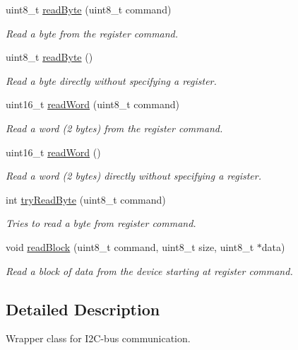 \begin{DoxyCompactItemize}
uint8\-\_\-t \hyperlink{class_i2_c_bus_a3b7cd32f752e2a5eeb6a5bdaf9267282}{read\-Byte} (uint8\-\_\-t command)
\begin{DoxyCompactList}\small\item\em \-Read a byte from the register command. \end{DoxyCompactList}\item 
uint8\-\_\-t \hyperlink{class_i2_c_bus_a1f9b4e6e0771e3de031aab0f8c5bc691}{read\-Byte} ()
\begin{DoxyCompactList}\small\item\em \-Read a byte directly without specifying a register. \end{DoxyCompactList}\item 
uint16\-\_\-t \hyperlink{class_i2_c_bus_a4db730c58bf5bab95bae47c976ccd825}{read\-Word} (uint8\-\_\-t command)
\begin{DoxyCompactList}\small\item\em \-Read a word (2 bytes) from the register command. \end{DoxyCompactList}\item 
uint16\-\_\-t \hyperlink{class_i2_c_bus_a09abdc7887db46a7f9a26f37754ad6d1}{read\-Word} ()
\begin{DoxyCompactList}\small\item\em \-Read a word (2 bytes) directly without specifying a register. \end{DoxyCompactList}\item 
int \hyperlink{class_i2_c_bus_a9aefab7f4230de3dc45385d1c79d4fe5}{try\-Read\-Byte} (uint8\-\_\-t command)
\begin{DoxyCompactList}\small\item\em \-Tries to read a byte from register command. \end{DoxyCompactList}\item 
void \hyperlink{class_i2_c_bus_a3f0bed946e8431cacbac1f214ba03232}{read\-Block} (uint8\-\_\-t command, uint8\-\_\-t size, uint8\-\_\-t $\ast$data)
\begin{DoxyCompactList}\small\item\em \-Read a block of data from the device starting at register command. \end{DoxyCompactList}\end{DoxyCompactItemize}


\subsection{\-Detailed \-Description}
\-Wrapper class for \-I2\-C-\/bus communication. 

